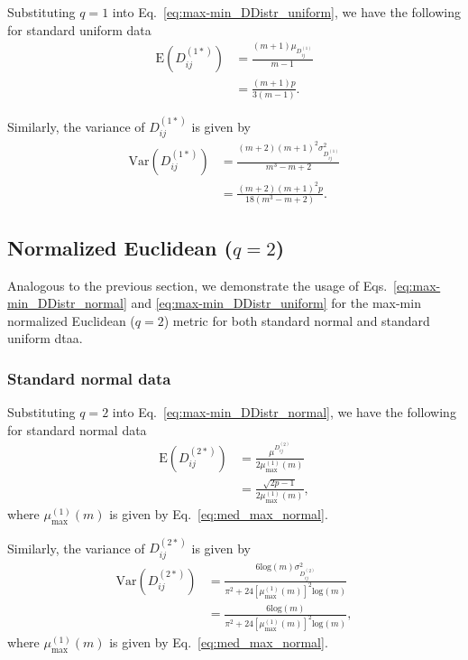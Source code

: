 \documentclass[10pt,letterpaper]{article}\usepackage[]{graphicx}\usepackage[]{color}
\begin{document}
Substituting $q=1$ into Eq.~\ref{eq:max-min_DDistr_uniform}, we have the following for standard uniform data
%
\begin{equation}
\begin{aligned}
\text{E}\left(D^{(1*)}_{ij}\right) &= \frac{(m+1)\mu_{D^{(1)}_{ij}}}{m-1} \\
&= \frac{(m+1)p}{3(m-1)}.
\end{aligned}
\end{equation}

Similarly, the variance of $D^{(1*)}_{ij}$ is given by
%
\begin{equation}
\begin{aligned}
\text{Var}\left(D^{(1*)}_{ij}\right) &= \frac{(m+2)(m+1)^2\sigma^2_{D^{(1)}_{ij}}}{m^3-m+2} \\
&= \frac{(m+2)(m+1)^2p}{18(m^3 - m + 2)}.
\end{aligned}
\end{equation}

\subsection{Normalized Euclidean \texorpdfstring{($q=2$)}{}}

Analogous to the previous section, we demonstrate the usage of Eqs.~\ref{eq:max-min_DDistr_normal} and \ref{eq:max-min_DDistr_uniform} for the max-min normalized Euclidean ($q=2$) metric for both standard normal and standard uniform dtaa.

\subsubsection{Standard normal data}

Substituting $q=2$ into Eq.~\ref{eq:max-min_DDistr_normal}, we have the following for standard normal data
%
\begin{equation}
\begin{aligned}
\text{E}\left(D^{(2*)}_{ij}\right) &= \frac{\mu^{D^{(2)}_{ij}}}{2\mu^{(1)}_\text{max}(m)} \\
&= \frac{\sqrt{2p - 1}}{2\mu^{(1)}_\text{max}(m)},
\end{aligned}
\end{equation}
where $\mu^{(1)}_\text{max}(m)$ is given by Eq.~\ref{eq:med_max_normal}.

Similarly, the variance of $D^{(2*)}_{ij}$ is given by
%
\begin{equation}
\begin{aligned}
\text{Var}\left(D^{(2*)}_{ij}\right) &= \frac{6\text{log}(m)\sigma^2_{D^{(2)}_{ij}}}{\pi^2 + 24\left[\mu^{(1)}_\text{max}(m)\right]^2\text{log}(m)} \\
&= \frac{6\text{log}(m)}{\pi^2 + 24\left[\mu^{(1)}_\text{max}(m)\right]^2\text{log}(m)},
\end{aligned}
\end{equation}
where $\mu^{(1)}_\text{max}(m)$ is given by Eq.~\ref{eq:med_max_normal}.
\end{document}

